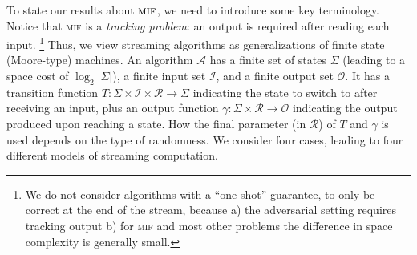 \documentclass[10pt,a4paper]{article}
\theoremstyle{definition}
\theoremstyle{remark}
\newcommand{\cA}{\mathcal{A}}
\newcommand{\cI}{\mathcal{I}}
\newcommand{\cO}{\mathcal{O}}
\newcommand{\cR}{\mathcal{R}}
\newcommand{\mif}{\textsc{mif}\xspace}
\newcommand{\trans}{T}                      %
\begin{document}
To state our results about $\mif$, we need to introduce some key terminology.
Notice that \mif is a {\em tracking problem}: an output is required after
reading each input.%
%
\footnote{We do not consider algorithms with a ``one-shot'' guarantee, to only
be correct at the end of the stream, because a) the adversarial setting
requires tracking output b) for \mif and most other problems the difference
in space complexity is generally small.} 
%
Thus, we view streaming algorithms as generalizations of finite state
(Moore-type) machines. An algorithm $\cA$ has a finite set of states $\Sigma$
(leading to a space cost of $\log_2|\Sigma|$), a finite input set $\cI$, and a
finite output set $\cO$.  It has a transition function $\trans \colon \Sigma
\times \cI \times \cR \to \Sigma$ indicating the state to switch to after
receiving an input, plus an output function $\gamma \colon \Sigma \times \cR
\to \cO$ indicating the output produced upon reaching a state. How the final
parameter (in $\cR$) of $\trans$ and $\gamma$ is used depends on the type of
randomness. We consider four cases, leading to four different models of
streaming computation.
\end{document}
